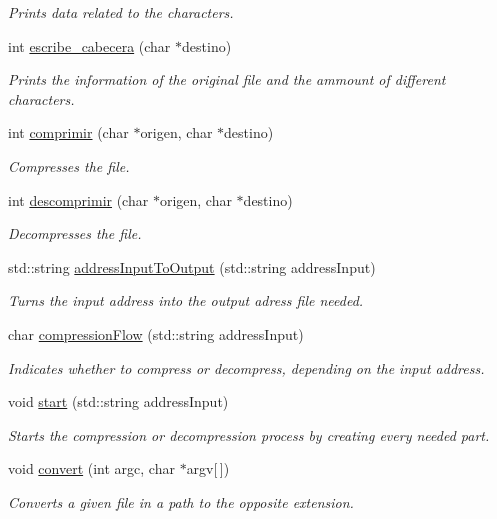 \begin{DoxyCompactItemize}
\begin{DoxyCompactList}\small\item\em Prints data related to the characters. \end{DoxyCompactList}\item 
int \hyperlink{classHuffman_ad904474d3bfa10306991edb16dd5a763}{escribe\+\_\+cabecera} (char $\ast$destino)
\begin{DoxyCompactList}\small\item\em Prints the information of the original file and the ammount of different characters. \end{DoxyCompactList}\item 
int \hyperlink{classHuffman_a1416565c30023347739a197baf8f8a67}{comprimir} (char $\ast$origen, char $\ast$destino)
\begin{DoxyCompactList}\small\item\em Compresses the file. \end{DoxyCompactList}\item 
int \hyperlink{classHuffman_a172d8e682b217a2b0f02e6df303bd5fa}{descomprimir} (char $\ast$origen, char $\ast$destino)
\begin{DoxyCompactList}\small\item\em Decompresses the file. \end{DoxyCompactList}\item 
std\+::string \hyperlink{classHuffman_a350ba5e1310462b12037f1d1d8b6fc74}{address\+Input\+To\+Output} (std\+::string address\+Input)
\begin{DoxyCompactList}\small\item\em Turns the input address into the output adress file needed. \end{DoxyCompactList}\item 
char \hyperlink{classHuffman_a6927f13ed42f1bcded716277cfbc966d}{compression\+Flow} (std\+::string address\+Input)
\begin{DoxyCompactList}\small\item\em Indicates whether to compress or decompress, depending on the input address. \end{DoxyCompactList}\item 
void \hyperlink{classHuffman_a8ff9db082a4eb00c6e3a77b8dc65ad73}{start} (std\+::string address\+Input)
\begin{DoxyCompactList}\small\item\em Starts the compression or decompression process by creating every needed part. \end{DoxyCompactList}\item 
void \hyperlink{classHuffman_abac14be26f9859fdf4a894815c42b138}{convert} (int argc, char $\ast$argv\mbox{[}$\,$\mbox{]})
\begin{DoxyCompactList}\small\item\em Converts a given file in a path to the opposite extension. \end{DoxyCompactList}\end{DoxyCompactItemize}


